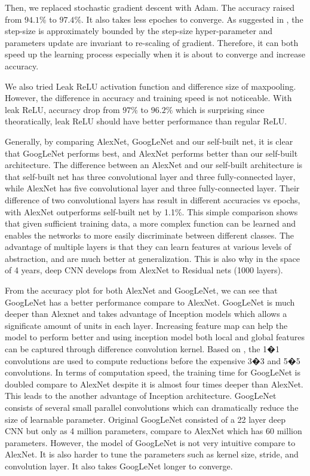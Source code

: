 \documentclass{article} %
\begin{document}
Then, we replaced stochastic gradient descent with Adam. The accuracy raised from $94.1\%$ to $97.4\%$.
It also takes less epoches to converge. As suggested in \cite{adam}, the step-size is approximately bounded
by the step-size hyper-parameter and parameters update are invariant to re-scaling of gradient. Therefore, 
it can both speed up the learning process especially when it is about to converge and increase accuracy. \

We also tried Leak ReLU activation function and difference size of maxpooling. However, the difference in accuracy
and training speed is not noticeable. With leak ReLU, accuracy drop from $97\%$ to $96.2\%$ which is 
surprising since theoratically, leak ReLU should have better performance than regular ReLU.  

Generally, by comparing AlexNet, GoogLeNet and our self-built net, it is clear that GoogLeNet performs best, and AlexNet performs better than our self-built architecture. The difference between an AlexNet and our self-built architecture is that self-built net has three convolutional layer and three fully-connected layer, while AlexNet has five convolutional layer and three fully-connected layer. Their difference of two convolutional layers has result in different accuracies vs epochs, with AlexNet outperforms self-built net by 1.1\%. This simple comparison shows that given sufficient training data, a more complex function can be learned and enables the networks to more easily discriminate between different classes. The advantage of multiple layers is that they can learn features at various levels of abstraction, and are much better at generalization. This is also why in the space of 4 years, deep CNN develops from AlexNet to Residual nets (1000 layers).

From the accuracy plot for both AlexNet and GoogLeNet, we can see that GoogLeNet has a better performance compare to AlexNet. GoogLeNet is much deeper than Alexnet and takes advantage of Inception models which allows a significate amount of units in each layer. Increasing feature map can help the model to perform better and using inception model both local and global features can be captured through difference convolution kernel. Based on \cite{Googlenet}, the 1�1 convolutions are used to compute reductions before the expensive 3�3 and 5�5 convolutions. 
In terms of computation speed, the training time for GoogLeNet is doubled compare to AlexNet despite it is almost four times deeper than AlexNet. This leads to the another advantage of Inception architecture. GoogLeNet consists of several small parallel convolutions which can dramatically reduce the size of learnable parameter. Original GoogLeNet consisted of a 22 layer deep CNN but only as 4 million parameters, compare to AlexNet which has 60 million parameters. 
However, the model of GoogLeNet is not very intuitive compare to AlexNet. It is also harder to tune the parameters such as kernel size, stride, and convolution layer. It also takes GoogLeNet longer to converge.
\end{document}
